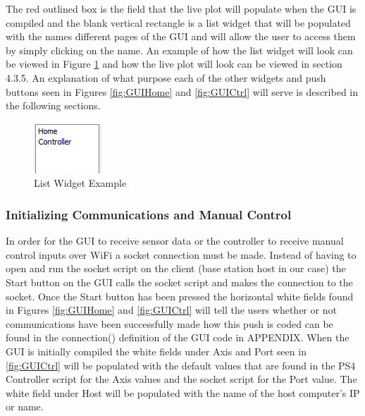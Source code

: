 The red outlined box is the field that the live plot will populate when the GUI is compiled and the blank vertical rectangle is a list widget that will be populated with the names different pages of the GUI and will allow the user to access them by simply clicking on the name. An example of how the list widget will look can be viewed in Figure \ref{fig:list} and how the live plot will look can be viewed in section 4.3.5. An explanation of what purpose each of the other widgets and push buttons seen in Figures \ref{fig:GUIHome} and \ref{fig:GUICtrl} will serve is described in the following sections.
\begin{figure}[H]
	\includegraphics[width=\linewidth]{listWidget.png}
	\caption{List Widget Example}
	\label{fig:list}
\end{figure}
\subsubsection{Initializing Communications and Manual Control}
In order for the GUI to receive sensor data or the controller to receive manual control inputs over WiFi a socket connection must be made. Instead of having to open and run the socket script on the client (base station host in our case) the Start button on the GUI calls the socket script and makes the connection to the socket. Once the Start button has been pressed the horizontal white fields found in Figures \ref{fig:GUIHome} and \ref{fig:GUICtrl} will tell the users whether or not communications have been successfully made how this push is coded can be found in the connection() definition of the GUI code in APPENDIX. When the GUI is initially compiled the white fields under Axis and Port seen in \ref{fig:GUICtrl} will be populated with the default values that are found in the PS4 Controller script for the Axis values and the socket script for the Port value. The white field under Host will be populated with the name of the host computer's IP or name. 

